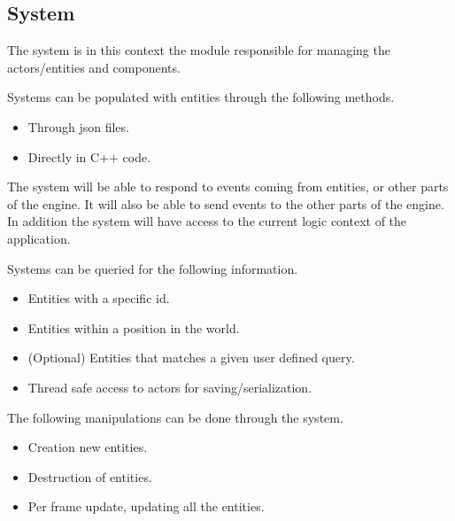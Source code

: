 \subsection{System}
The system is in this context the module responsible for managing the actors/entities and components.

Systems can be populated with entities through the following methods.
\begin{itemize}
    \item
    Through json files.

    \item
    Directly in C++ code.
\end{itemize}

The system will be able to respond to events coming from entities, or other parts of the engine. 
It will also be able to send events to the other parts of the engine.
In addition the system will have access to the current logic context of the application.

Systems can be queried for the following information.
\begin{itemize}
    \item
    Entities with a specific id.

    \item
    Entities within a position in the world.

    \item
    (Optional) Entities that matches a given user defined query.

    \item
    Thread safe access to actors for saving/serialization.
\end{itemize}

The following manipulations can be done through the system.
\begin{itemize}
    \item
    Creation new entities.

    \item
    Destruction of entities.

    \item
    Per frame update, updating all the entities.
\end{itemize}
